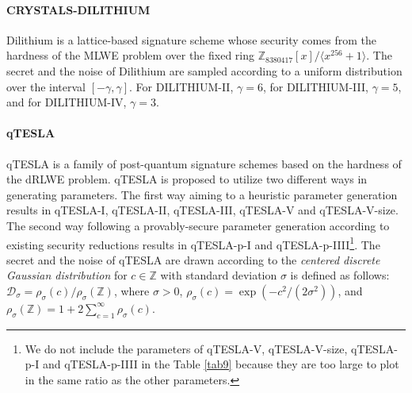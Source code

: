 \documentclass{cta-author}
\begin{document}
\paragraph{CRYSTALS-DILITHIUM \cite{DKL+19}} 

Dilithium is a lattice-based signature scheme whose security comes from the hardness of the MLWE problem over the fixed ring  $\mathbb{Z}_{8380417}[x]/\langle x^{256}+1 \rangle$. The secret and the noise of Dilithium are sampled according to a uniform distribution over the interval $[-\gamma, \gamma]$. For DILITHIUM-II, $\gamma=6$, for DILITHIUM-III, $\gamma=5$, and for DILITHIUM-IV, $\gamma=3$.



\paragraph{qTESLA \cite{BAA+19}}
qTESLA is a family of post-quantum signature schemes based on the hardness of the dRLWE problem. qTESLA is proposed to utilize two different ways in generating parameters. The first way aiming to a heuristic parameter generation results in qTESLA-I, qTESLA-II, qTESLA-III, qTESLA-V  and qTESLA-V-size. The second way following a provably-secure parameter generation according to existing security reductions results in qTESLA-p-I and qTESLA-p-IIII\footnote[3]{We do not include the parameters of qTESLA-V, qTESLA-V-size, qTESLA-p-I  and qTESLA-p-IIII in the Table \ref{tab9}  because they are too large to plot in the same ratio as the other parameters.}. The secret and the noise of qTESLA are drawn according to the \textit{centered discrete Gaussian distribution} for $c \in \mathbb{Z}$ with standard deviation $\sigma$ is defined as follows: $\mathcal{D}_{\sigma}=\rho_{\sigma}(c)/\rho_{\sigma}(\mathbb{Z})$, where $\sigma>0$, $\rho_{\sigma}(c)=\exp(-c^2/(2\sigma^2))$, and
$\rho_{\sigma}(\mathbb{Z})=1+2\sum_{c=1}^{\infty}\rho_{\sigma}(c).$

 
 
\end{document}
